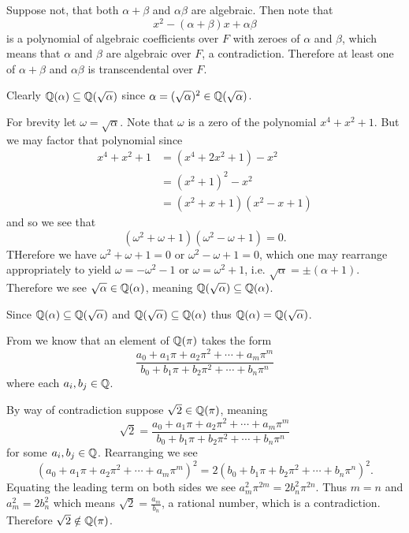 \begin{questions}
\begin{partquestions}{\roman*}
        \item Suppose not, that both $\alpha + \beta$ and $\alpha\beta$ are algebraic. Then note that
        \[
            x^2 - (\alpha+\beta)x + \alpha\beta
        \]
        is a polynomial of algebraic coefficients over $F$ with zeroes of $\alpha$ and $\beta$, which means that $\alpha$ and $\beta$ are algebraic over $F$, a contradiction. Therefore at least one of $\alpha + \beta$ and $\alpha\beta$ is transcendental over $F$.
    \end{partquestions}

    \item Clearly $\mathbb{Q}(\alpha) \subseteq \mathbb{Q}(\sqrt\alpha)$ since $\alpha = (\sqrt\alpha)^2 \in \mathbb{Q}(\sqrt\alpha)$.
    
    For brevity let $\omega = \sqrt\alpha$. Note that $\omega$ is a zero of the polynomial $x^4+x^2+1$. But we may factor that polynomial since
    \begin{align*}
        x^4 + x^2 + 1 &= (x^4 + 2x^2 + 1) - x^2\\
        &= (x^2+1)^2 - x^2\\
        &= (x^2+x+1)(x^2-x+1)
    \end{align*}
    and so we see that
    \[
        (\omega^2+\omega+1)(\omega^2-\omega+1) = 0.
    \]
    THerefore we have $\omega^2+\omega+1 = 0$ or $\omega^2-\omega+1 = 0$, which one may rearrange appropriately to yield $\omega = -\omega^2-1$ or $\omega = \omega^2 + 1$, i.e. $\sqrt\alpha = \pm(\alpha+1)$. Therefore we see $\sqrt\alpha \in \mathbb{Q}(\alpha)$, meaning $\mathbb{Q}(\sqrt\alpha) \subseteq \mathbb{Q}(\alpha)$.

    Since $\mathbb{Q}(\alpha) \subseteq \mathbb{Q}(\sqrt\alpha)$ and $\mathbb{Q}(\sqrt\alpha) \subseteq \mathbb{Q}(\alpha)$ thus $\mathbb{Q}(\alpha) = \mathbb{Q}(\sqrt\alpha)$.
    
    \item From  we know that an element of $\mathbb{Q}(\pi)$ takes the form
    \[
        \frac{a_0 + a_1\pi + a_2\pi^2 + \cdots + a_m\pi^m}{b_0 + b_1\pi + b_2\pi^2 + \cdots + b_n\pi^n}
    \]
    where each $a_i, b_j \in \mathbb{Q}$.

    By way of contradiction suppose $\sqrt2 \in \mathbb{Q}(\pi)$, meaning
    \[
        \sqrt2 = \frac{a_0 + a_1\pi + a_2\pi^2 + \cdots + a_m\pi^m}{b_0 + b_1\pi + b_2\pi^2 + \cdots + b_n\pi^n}
    \]
    for some $a_i, b_j \in \mathbb{Q}$. Rearranging we see
    \[
        \left(a_0 + a_1\pi + a_2\pi^2 + \cdots + a_m\pi^m\right)^2 = 2\left(b_0 + b_1\pi + b_2\pi^2 + \cdots + b_n\pi^n\right)^2.
    \]
    Equating the leading term on both sides we see $a_m^2\pi^{2m} = 2b_n^2\pi^{2n}$. Thus $m = n$ and $a_m^2 = 2b_n^2$ which means $\sqrt2 = \frac{a_m}{b_n}$, a rational number, which is a contradiction. Therefore $\sqrt2 \notin \mathbb{Q}(\pi)$.
    

\end{questions}
